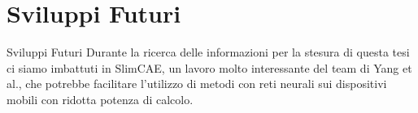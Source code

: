 \section{Sviluppi Futuri}

    \begin{frame}{Sviluppi Futuri}
        Durante la ricerca delle informazioni per la stesura di questa tesi ci siamo imbattuti in SlimCAE\footnotemark[1], un lavoro molto interessante del team di Yang et al., che potrebbe facilitare l'utilizzo di metodi con reti neurali sui dispositivi mobili con ridotta potenza di calcolo.
    \end{frame}
    